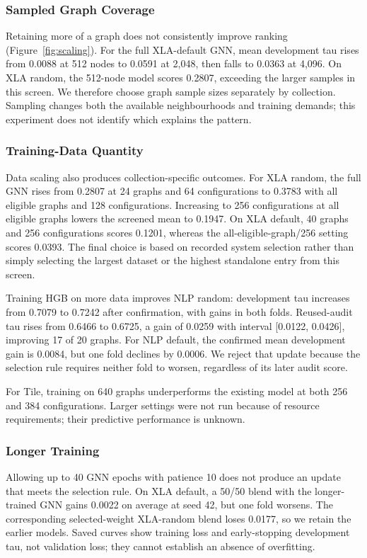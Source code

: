 \documentclass[letterpaper]{article}
\begin{document}
\subsubsection{Sampled Graph Coverage}
Retaining more of a graph does not consistently improve ranking (Figure~\ref{fig:scaling}). For the full XLA-default GNN, mean development tau rises from 0.0088 at 512 nodes to 0.0591 at 2,048, then falls to 0.0363 at 4,096. On XLA random, the 512-node model scores 0.2807, exceeding the larger samples in this screen. We therefore choose graph sample sizes separately by collection. Sampling changes both the available neighbourhoods and training demands; this experiment does not identify which explains the pattern.

\subsubsection{Training-Data Quantity}
Data scaling also produces collection-specific outcomes. For XLA random, the full GNN rises from 0.2807 at 24 graphs and 64 configurations to 0.3783 with all eligible graphs and 128 configurations. Increasing to 256 configurations at all eligible graphs lowers the screened mean to 0.1947. On XLA default, 40 graphs and 256 configurations scores 0.1201, whereas the all-eligible-graph/256 setting scores 0.0393. The final choice is based on recorded system selection rather than simply selecting the largest dataset or the highest standalone entry from this screen.

Training HGB on more data improves NLP random: development tau increases from 0.7079 to 0.7242 after confirmation, with gains in both folds. Reused-audit tau rises from 0.6466 to 0.6725, a gain of 0.0259 with interval [0.0122, 0.0426], improving 17 of 20 graphs. For NLP default, the confirmed mean development gain is 0.0084, but one fold declines by 0.0006. We reject that update because the selection rule requires neither fold to worsen, regardless of its later audit score.

For Tile, training on 640 graphs underperforms the existing model at both 256 and 384 configurations. Larger settings were not run because of resource requirements; their predictive performance is unknown.

\subsubsection{Longer Training}
Allowing up to 40 GNN epochs with patience 10 does not produce an update that meets the selection rule. On XLA default, a 50/50 blend with the longer-trained GNN gains 0.0022 on average at seed 42, but one fold worsens. The corresponding selected-weight XLA-random blend loses 0.0177, so we retain the earlier models. Saved curves show training loss and early-stopping development tau, not validation loss; they cannot establish an absence of overfitting.
\end{document}
